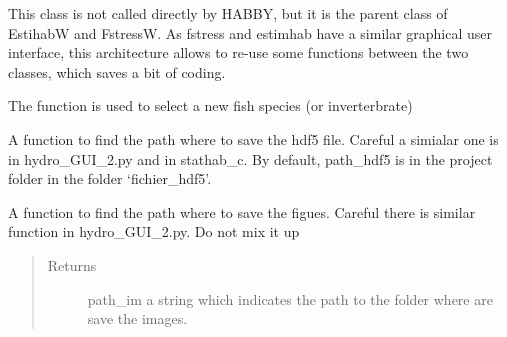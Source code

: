 \documentclass[letterpaper,10pt,english]{sphinxmanual}
\begin{document}
\begin{fulllineitems}
\label{\detokenize{index:src_GUI.estimhab_GUI.StatModUseful}}
This class is not called directly by HABBY, but it is the parent class of EstihabW and FstressW. As fstress and
estimhab have a similar graphical user interface, this architecture allows to re-use some functions between the
two classes, which saves a bit of coding.

\begin{fulllineitems}
\label{\detokenize{index:src_GUI.estimhab_GUI.StatModUseful.add_fish}}
The function is used to select a new fish species (or inverterbrate)

\end{fulllineitems}


\begin{fulllineitems}
\label{\detokenize{index:src_GUI.estimhab_GUI.StatModUseful.find_path_hdf5_est}}
A function to find the path where to save the hdf5 file. Careful a simialar one is in hydro\_GUI\_2.py and in
stathab\_c. By default, path\_hdf5 is in the project folder in the folder `fichier\_hdf5'.

\end{fulllineitems}


\begin{fulllineitems}
\label{\detokenize{index:src_GUI.estimhab_GUI.StatModUseful.find_path_im_est}}
A function to find the path where to save the figues. Careful there is similar function in hydro\_GUI\_2.py.
Do not mix it up
\begin{quote}\begin{description}
\item[{Returns}] \leavevmode
path\_im a string which indicates the path to the folder where are save the images.

\end{description}\end{quote}


\end{fulllineitems}
\end{fulllineitems}
\end{document}
